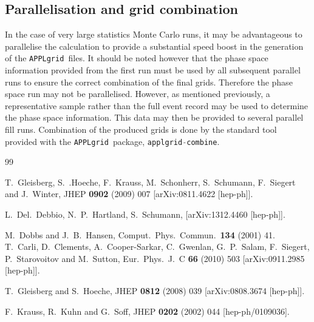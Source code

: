 \documentclass[11pt]{article}
\newcommand{\appl} {{\tt APPLgrid }}
\begin{document}
\subsection{Parallelisation and grid combination} 
In the case of very large statistics Monte Carlo runs, it may be advantageous to parallelise the calculation to provide a substantial speed boost in the generation of the \appl files. It should be noted however that the phase space information provided from the first run must be used by all subsequent parallel runs to ensure the correct combination of the final grids. Therefore the phase space run may not be parallelised. However, as mentioned previously, a representative sample rather than the full event record may be used to determine the phase space information. This data may then be provided to several parallel fill runs. Combination of the produced grids is done by the standard tool provided with the \appl package, \lstinline[language=c++]{applgrid-combine}.
\begin{thebibliography}{99}


  T.~Gleisberg, S.~.Hoeche, F.~Krauss, M.~Schonherr, S.~Schumann, F.~Siegert and J.~Winter,
  JHEP {\bf 0902} (2009) 007
  [arXiv:0811.4622 [hep-ph]].

  L.~Del.~Debbio, N.~P.~Hartland, S.~Schumann, [arXiv:1312.4460 [hep-ph]].
  
  M.~Dobbs and J.~B.~Hansen,
  Comput.\ Phys.\ Commun.\  {\bf 134} (2001) 41.\\
  
  T.~Carli, D.~Clements, A.~Cooper-Sarkar, C.~Gwenlan, G.~P.~Salam, F.~Siegert, P.~Starovoitov and M.~Sutton,
  Eur.\ Phys.\ J.\ C {\bf 66} (2010) 503
  [arXiv:0911.2985 [hep-ph]].
  


  
  T.~Gleisberg and S.~Hoeche,
  JHEP {\bf 0812} (2008) 039
  [arXiv:0808.3674 [hep-ph]].

  F.~Krauss, R.~Kuhn and G.~Soff,
  JHEP {\bf 0202} (2002) 044
  [hep-ph/0109036].
  
\end{thebibliography}
\end{document}
